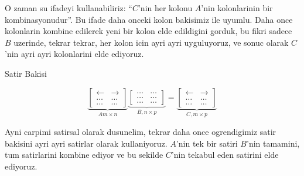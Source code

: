 \documentclass[12pt,fleqn]{article}\usepackage{../common}
\begin{document}
O zaman su ifadeyi kullanabiliriz: ``$C$'nin her kolonu $A$'nin
kolonlarinin bir kombinasyonudur''. Bu ifade daha onceki kolon bakisimiz
ile uyumlu. Daha once kolonlarin kombine edilerek yeni bir kolon elde
edildigini gorduk, bu fikri sadece $B$ uzerinde, tekrar tekrar, her kolon
icin ayri ayri uyguluyoruz, ve sonuc olarak $C$'nin ayri ayri kolonlarini
elde ediyoruz.

Satir Bakisi

$$ 
\underbrace{
\left[\begin{array}{rr}
\leftarrow  & \rightarrow  \\
\dots & \dots \\
\dots & \dots 
\end{array}\right]
}_{A m \times n}
\underbrace{
\left[\begin{array}{rr}
\dots & \dots \\
\dots & \dots \\
\dots & \dots
\end{array}\right] 
}_{B, n \times p}
=
\underbrace{
\left[\begin{array}{rr}
\leftarrow  & \rightarrow  \\
\dots & \dots  \\
\dots & \dots 
\end{array}\right] 
}_{C, m \times p}
$$

Ayni carpimi satirsal olarak dusunelim, tekrar daha once ogrendigimiz satir
bakisini ayri ayri satirlar olarak kullaniyoruz. $A$'nin tek bir satiri
$B$'nin tamamini, tum satirlarini kombine ediyor ve bu sekilde $C$'nin
tekabul eden satirini elde ediyoruz. 
\end{document}
